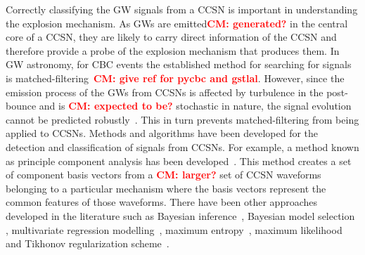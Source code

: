 \documentclass[aps,twocolumn,showpacs,groupedaddress, nofootinbib]{revtex4}  %
\newcommand{\cm}[1]{\textbf{\textcolor{red}{CM: #1}}}
\begin{document}
%
%
Correctly classifying the \ac{GW} signals from a \ac{CCSN} is important in
understanding the explosion mechanism.
As \acp{GW} are emitted\cm{generated?} in the central core of a \ac{CCSN}, they
are likely to carry direct information of the \ac{CCSN} and therefore provide a
probe of the explosion mechanism that produces them. In \ac{GW} astronomy, for
\ac{CBC} events the established method for searching for signals is
matched-filtering~\cm{give ref for pycbc and gstlal}. However, since the
emission process of the \acp{GW} from \acp{CCSN} is affected by turbulence in
the post-bounce and is \cm{expected to be?} stochastic in nature,  the signal
evolution cannot be predicted robustly~\cite{ott2009gravitational,
kotake2013multiple, kotake2009stochastic}.  This in turn prevents
matched-filtering from being applied to \acp{CCSN}.
Methods and algorithms have been developed for the detection and classification
of signals from \acp{CCSN}.  For example, a method known as principle component
analysis has been developed~\cite{heng2009rotating, rover2009bayesian,
powell2015classification, powell2017classification,
suvorova2019reconstructing}. This method creates a set of component basis
vectors from a \cm{larger?} set of \ac{CCSN} waveforms belonging to a
particular mechanism where the basis vectors represent the common features of
those waveforms.  There have been other approaches developed in the literature
such as Bayesian inference~\cite{rover2009bayesian}, Bayesian model
selection~\cite{logue2012inferring} , multivariate regression
modelling~\cite{engels2014multivariate}, maximum
entropy~\cite{summerscales2008maximum}, maximum
likelihood~\cite{gursel1989near} and Tikhonov regularization
scheme~\cite{rakhmanov2006rank, hayama2007coherent}.  
\end{document}
